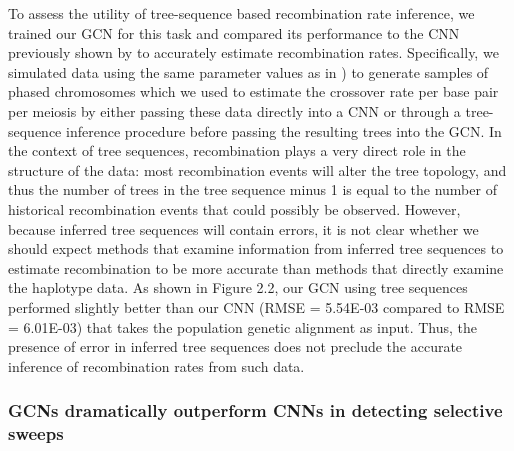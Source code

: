 To assess the utility of tree-sequence based recombination rate inference, we trained our GCN for this task and compared its performance to the CNN previously shown by \cite{flagelUnreasonableEffectivenessConvolutional2019} to accurately estimate recombination rates. Specifically, we simulated data using the same parameter values as in \cite{flagelUnreasonableEffectivenessConvolutional2019}) to generate samples of phased chromosomes which we used to estimate the crossover rate per base pair per meiosis by either passing these data directly into a CNN or through a tree-sequence inference procedure before passing the resulting trees into the GCN. In the context of tree sequences, recombination plays a very direct role in the structure of the data: most recombination events will alter the tree topology, and thus the number of trees in the tree sequence minus 1 is equal to the number of historical recombination events that could possibly be observed. However, because inferred tree sequences will contain errors, it is not clear whether we should expect methods that examine information from inferred tree sequences to estimate recombination to be more accurate than methods that directly examine the haplotype data. As shown in Figure 2.2, our GCN using tree sequences performed slightly better than our CNN (RMSE = 5.54E-03 compared to RMSE = 6.01E-03) that takes the population genetic alignment as input. Thus, the presence of error in inferred tree sequences does not preclude the accurate inference of recombination rates from such data.

\subsubsection{GCNs dramatically outperform CNNs in detecting selective sweeps}

